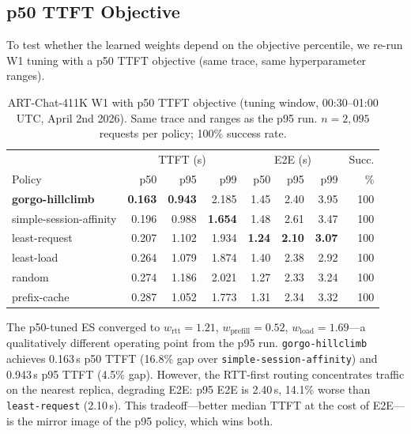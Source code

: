 \documentclass{article}
\begin{document}
\subsection{p50 TTFT Objective}
\label{sec:results:p50}

To test whether the learned weights depend on the objective percentile, we
re-run W1 tuning with a p50 TTFT objective (same trace, same hyperparameter
ranges).

\begin{table}[t]
\centering
\small
\caption{ART-Chat-411K W1 with p50 TTFT objective (tuning window, 00:30--01:00 UTC,
  April 2nd 2026). Same trace and ranges as the p95 run.
  $n{=}2{,}095$ requests per policy; 100\% success rate.}
\label{tab:w1_p50}
\begin{tabular}{lrrr|rrr|r}
\toprule
 & \multicolumn{3}{c|}{TTFT (s)} & \multicolumn{3}{c|}{E2E (s)} & Succ. \\
Policy & p50 & p95 & p99 & p50 & p95 & p99 & \% \\
\midrule
\textbf{gorgo-hillclimb} & \textbf{0.163} & \textbf{0.943} & 2.185 & 1.45 & 2.40 & 3.95 & 100 \\
simple-session-affinity   & 0.196          & 0.988          & \textbf{1.654} & 1.48 & 2.61 & 3.47 & 100 \\
least-request             & 0.207          & 1.102          & 1.934 & \textbf{1.24} & \textbf{2.10} & \textbf{3.07} & 100 \\
least-load                & 0.264          & 1.079          & 1.874 & 1.40 & 2.38 & 2.92 & 100 \\
random                    & 0.274          & 1.186          & 2.021 & 1.27 & 2.33 & 3.24 & 100 \\
prefix-cache              & 0.287          & 1.052          & 1.773 & 1.31 & 2.34 & 3.32 & 100 \\
\bottomrule
\end{tabular}
\end{table}

The p50-tuned ES converged to $w_{\mathrm{rtt}}{=}1.21$,
$w_{\mathrm{prefill}}{=}0.52$, $w_{\mathrm{load}}{=}1.69$---a qualitatively
different operating point from the p95 run. \texttt{gorgo-hillclimb} achieves
0.163\,s p50 TTFT (16.8\% gap over \texttt{simple-session-affinity}) and
0.943\,s p95 TTFT (4.5\% gap). However, the RTT-first routing concentrates
traffic on the nearest replica, degrading E2E: p95 E2E is 2.40\,s, 14.1\%
worse than \texttt{least-request} (2.10\,s). This tradeoff---better median TTFT
at the cost of E2E---is the mirror image of the p95 policy, which wins both.
\end{document}
